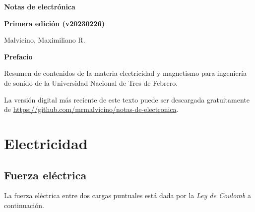 \documentclass[a5paper,12pt,twoside]{book}
\begin{document}
\pagestyle{fancy}
\fancyhf{}
\chead{\scriptsize \nouppercase\rightmark}
\cfoot{\scriptsize \thepage}
\renewcommand{\headrulewidth}{0pt}

\frontmatter
% 

\begin{center}
    \begin{Huge}
        \textbf{Notas de electrónica}
    \end{Huge}

    \vspace{1cm}
    \textbf{Primera edición (v20230226)}
    \vspace{2cm}

    \begin{Large}
        Malvicino, Maximiliano R.
    \end{Large}
\end{center}

\clearpage
\noindent
\textbf{Prefacio}

Resumen de contenidos de la materia electricidad y magnetismo para ingeniería de sonido de la Universidad Nacional de Tres de Febrero.

La versión digital más reciente de este texto puede ser descargada gratuitamente de \url{https://github.com/mrmalvicino/notas-de-electronica}.

\renewcommand{\spanishappendixname}{Anexo}
\tableofcontents

\mainmatter
{}


\chapter{Electricidad}






\section{Fuerza eléctrica}

La fuerza eléctrica entre dos cargas puntuales está dada por la \emph{Ley de Coulomb} a continuación.
\end{document}
